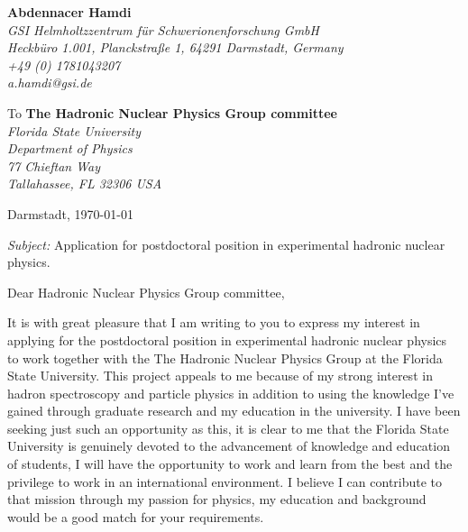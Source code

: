 \documentclass[11pt]{letter}
\begin{document}
 \sffamily
 \hfill
 \begin{flushleft}
 {\bfseries Abdennacer Hamdi}\\[.35ex]
 \small\itshape
 GSI Helmholtzzentrum f\"ur Schwerionenforschung GmbH\\
 Heckb\"uro 1.001, Planckstraße 1, 64291 Darmstadt, Germany\\[.35ex]
 +49 (0) 1781043207\\
 a.hamdi@gsi.de
 \end{flushleft}
 \begin{flushleft}
 To {\bfseries The Hadronic Nuclear Physics Group committee}\\[.35ex]
 \small\itshape
 Florida State University \\
 Department of Physics \\
 77 Chieftan Way \\
 Tallahassee, FL  32306  USA

 \end{flushleft}
 \hfill
 \begin{flushleft}
 Darmstadt, \today \\
 
 \end{flushleft}
\textit{Subject:} Application for postdoctoral position in experimental hadronic nuclear physics.\\
\par Dear Hadronic Nuclear Physics Group committee, 
~\par It is with great pleasure that I am writing to you to express my interest in applying for the postdoctoral position in experimental hadronic nuclear physics to work together with the The Hadronic Nuclear Physics Group at the Florida State University. This project appeals to me because of my strong interest in hadron spectroscopy and particle physics in addition to using the knowledge I’ve gained through graduate research and my education in the university. I have been seeking just such an opportunity as this, it is clear to me that the Florida State University is genuinely devoted to the advancement of knowledge and education of students, I will have the opportunity to work and learn from the best and the privilege to work in an international environment. I believe I can contribute to that mission through my passion for physics, my education and background would be a good match for your requirements.
\end{document}
